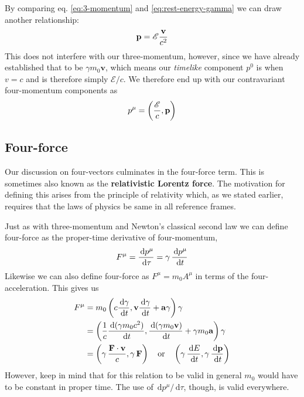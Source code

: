 \documentclass[english,seminar]{lecture}
\newcommand{\diff}{\,\textrm{d}}
\newcommand{\E}{\mathscr{E}}
\begin{document}
By comparing eq. \eqref{eq:3-momentum} and \eqref{eq:rest-energy-gamma} we can draw another relationship: $$\mathbf{p} = \E {\mathbf{v}\over c^2}$$ This does not interfere with our three-momentum, however, since we have already established that to be $\gamma m_0 \mathbf{v}$, which means our \textit{timelike} component $p^0$ is when $v = c$ and is therefore simply $\E / c$. We therefore end up with our contravariant four-momentum components as
\begin{equation}
	p^\mu = \left( {\E\over c},\mathbf{p} \right)
\end{equation}%

\subsection{Four-force}

Our discussion on four-vectors culminates in the four-force term. This is sometimes also known as the \textbf{relativistic Lorentz force}. The motivation for defining this arises from the principle of relativity which, as we stated earlier, requires that the laws of physics be same in all reference frames.

Just as with three-momentum and Newton's classical second law we can define four-force as the proper-time derivative of four-momentum,
\begin{equation}
	F^\mu = {\diff p^\mu \over \diff \tau} = \gamma \, {\diff p^\mu \over \diff t} \label{eq:4-force}
\end{equation}%
Likewise we can also define four-force as $F^\mu = m_0 A^\mu$ in terms of the four-acceleration. This gives us
\begin{align}
	F^\mu &= m_0\left( c{\diff \gamma \over \diff t}, \mathbf{v}{\diff \gamma \over \diff t}+\mathbf{a}\gamma \right)\gamma \nonumber\\
		  &= \left( {1\over c}{\diff (\gamma m_0c^2) \over \diff t}, {\diff (\gamma m_0 \mathbf{v}) \over \diff t} + \gamma m_0 \mathbf{a} \right) \gamma \nonumber\\
		  &= \left( \gamma\, {\mathbf{F\cdot v} \over c} , \gamma \, \mathbf{F} \right) \label{eq:4-force-acceleration} \quad \textrm{or} \quad \left( \gamma \, {\diff E \over \diff t}, \gamma \, {\diff \mathbf{p} \over \diff t} \right)
\end{align}
However, keep in mind that for this relation to be valid in general $m_0$ would have to be constant in proper time. The use of $\diff p^\mu/\diff \tau$, though, is valid everywhere.
\end{document}
